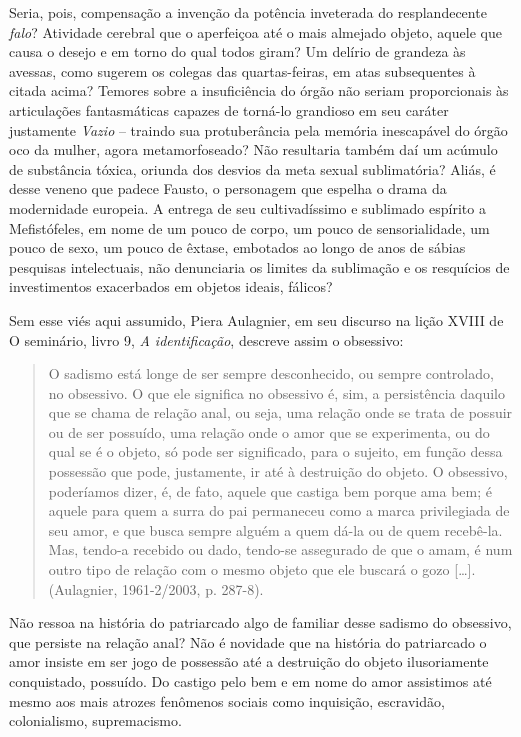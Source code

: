 Seria, pois, compensação a invenção da potência inveterada do
resplandecente \emph{falo}? Atividade cerebral que o aperfeiçoa até o
mais almejado objeto, aquele que causa o desejo e em torno do qual todos
giram? Um delírio de grandeza às avessas, como sugerem os colegas das
quartas-feiras, em atas subsequentes à citada acima? Temores sobre a
insuficiência do órgão não seriam proporcionais às articulações
fantasmáticas capazes de torná-lo grandioso em seu caráter justamente
\emph{Vazio} -- traindo sua protuberância pela memória inescapável do
órgão oco da mulher, agora metamorfoseado? Não resultaria também daí um
acúmulo de substância tóxica, oriunda dos desvios da meta sexual
sublimatória? Aliás, é desse veneno que padece Fausto, o personagem que
espelha o drama da modernidade europeia. A entrega de seu cultivadíssimo
e sublimado espírito a Mefistófeles, em nome de um pouco de corpo, um
pouco de sensorialidade, um pouco de sexo, um pouco de êxtase, embotados
ao longo de anos de sábias pesquisas intelectuais, não denunciaria os
limites da sublimação e os resquícios de investimentos exacerbados em
objetos ideais, fálicos?

Sem esse viés aqui assumido, Piera Aulagnier, em seu discurso na lição
XVIII de O seminário, livro 9, \emph{A identificação}, descreve assim o
obsessivo:

\begin{quote}
O sadismo está longe de ser sempre desconhecido, ou sempre controlado,
no obsessivo. O que ele significa no obsessivo é, sim, a persistência
daquilo que se chama de relação anal, ou seja, uma relação onde se trata
de possuir ou de ser possuído, uma relação onde o amor que se
experimenta, ou do qual se é o objeto, só pode ser significado, para o
sujeito, em função dessa possessão que pode, justamente, ir até à
destruição do objeto. O obsessivo, poderíamos dizer, é, de fato, aquele
que castiga bem porque ama bem; é aquele para quem a surra do pai
permaneceu como a marca privilegiada de seu amor, e que busca sempre
alguém a quem dá-la ou de quem recebê-la. Mas, tendo-a recebido ou dado,
tendo-se assegurado de que o amam, é num outro tipo de relação com o
mesmo objeto que ele buscará o gozo {[}\ldots{}{]}. (Aulagnier, 1961-2/2003,
p. 287-8).
\end{quote}

Não ressoa na história do patriarcado algo de familiar desse sadismo do
obsessivo, que persiste na relação anal? Não é novidade que na história
do patriarcado o amor insiste em ser jogo de possessão até a destruição
do objeto ilusoriamente conquistado, possuído. Do castigo pelo bem e em
nome do amor assistimos até mesmo aos mais atrozes fenômenos sociais
como inquisição, escravidão, colonialismo, supremacismo.

